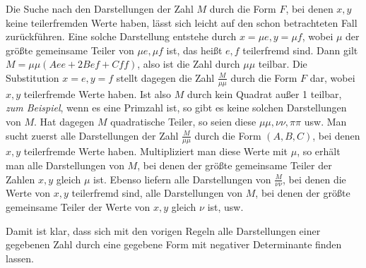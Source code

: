 Die Suche nach den Darstellungen der Zahl $M$ durch die Form $F$, bei denen $x,y$ keine teilerfremden Werte haben, lässt sich leicht auf den schon betrachteten Fall zurückführen. Eine solche Darstellung entstehe durch $x=\mu e,y=\mu f$, wobei $\mu$ der größte gemeinsame Teiler von $\mu e,\mu f$ ist, das heißt $e,f$ teilerfremd sind. Dann gilt $M=\mu\mu(Aee+2Bef+Cff)$, also ist die Zahl durch $\mu\mu$ teilbar. Die Substitution $x=e,y=f$ stellt dagegen die Zahl $\frac{M}{\mu\mu}$ durch die Form $F$ dar, wobei $x,y$ teilerfremde Werte haben. Ist also $M$ durch kein Quadrat außer 1 teilbar, \textit{zum Beispiel}, wenn es eine Primzahl ist, so gibt es keine solchen Darstellungen von $M$. Hat dagegen $M$ quadratische Teiler, so seien diese $\mu\mu,\nu\nu,\pi\pi$ usw. Man sucht zuerst alle Darstellungen der Zahl $\frac{M}{\mu\mu}$ durch die Form $(A,B,C)$, bei denen $x,y$ teilerfremde Werte haben. Multipliziert man diese Werte mit $\mu$, so erhält man alle Darstellungen von $M$, bei denen der größte gemeinsame Teiler der Zahlen $x,y$ gleich $\mu$ ist. Ebenso liefern alle Darstellungen von $\frac{M}{\nu\nu}$, bei denen die Werte von $x,y$ teilerfremd sind, alle Darstellungen von $M$, bei denen der größte gemeinsame Teiler der Werte von $x,y$ gleich $\nu$ ist, usw.

Damit ist klar, dass sich mit den vorigen Regeln alle Darstellungen einer gegebenen Zahl durch eine gegebene Form mit negativer Determinante finden lassen.
